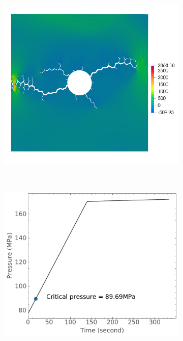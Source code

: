 \begin{figure}[htb!]
\begin{subfigure}[t]{0.32\linewidth}
    \caption{}
  \end{subfigure}
  \begin{subfigure}[t]{0.32\linewidth}
    \centering
    \includegraphics[width=\linewidth]{Chapter3/figures/r25_ext0_stress}
    \caption{}
  \end{subfigure}\\
  \begin{subfigure}[t]{0.32\linewidth}
    \centering
    \includegraphics[width=\linewidth]{Chapter3/figures/bubble_pressure_r0.5_ext0_rod196}

\end{subfigure}
\end{figure}
